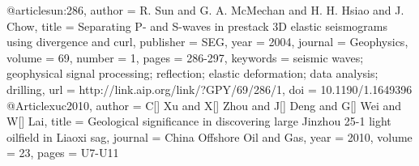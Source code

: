 @article{sun:286,
  author =	 {R. Sun and G. A. McMechan and H. H. Hsiao
                  and J. Chow},
  title =	 {Separating {P}- and {S}-waves in prestack {3D}
                  elastic seismograms using divergence and curl},
  publisher =	 {SEG},
  year =	 2004,
  journal =	 {Geophysics},
  volume =	 69,
  number =	 1,
  pages =	 {286-297},
  keywords =	 {seismic waves; geophysical signal processing;
                  reflection; elastic deformation; data analysis;
                  drilling},
  url =		 {http://link.aip.org/link/?GPY/69/286/1},
  doi =		 {10.1190/1.1649396}
}
@Article{xuc2010,
  author = 	 {C[] Xu and X[] Zhou and J[] Deng and G[] Wei and W[] Lai},
  title = 	 {Geological significance in discovering large Jinzhou 25-1 light oilfield in Liaoxi sag},
  journal = 	 {China Offshore Oil and Gas},
  year = 	 2010,
  volume = 	 23,
  pages = 	 {U7-U11}}


